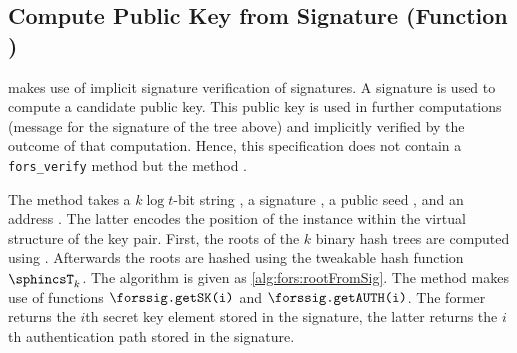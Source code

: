 \subsection{\fors Compute Public Key from Signature (Function \forspkfromsig)}

   \spx makes use of implicit signature verification of \fors signatures.
   A \fors signature is used to compute a candidate \fors public key. This
   public key is used in further computations (message for the signature of
   the \xmss tree above) and implicitly verified by the outcome of that computation. Hence, this specification does
   not contain a \texttt{fors\_verify} method but the method
   \forspkfromsig.

   The method \forspkfromsig takes a $k\log t$-bit string \msg,
   a \fors signature \forssig, a public seed \pseed, and
   an address \adrs. The latter encodes the position of the \fors
   instance within the virtual structure of the \spx key pair.
   First, the roots of the $k$ binary hash trees are computed using
   \forstreehash. Afterwards the roots are hashed using the tweakable hash
   function $\sphincsT_k$.
   The algorithm \forspkfromsig is given
   as \autoref{alg:fors:rootFromSig}. The method \forspkfromsig makes use of
   functions $\forssig\texttt{.getSK(i)}$ and $\forssig\texttt{.getAUTH(i)}$. The
   former returns the $i$th secret key element stored in the
   signature, the latter returns the $i$th authentication path stored in
   the signature.



